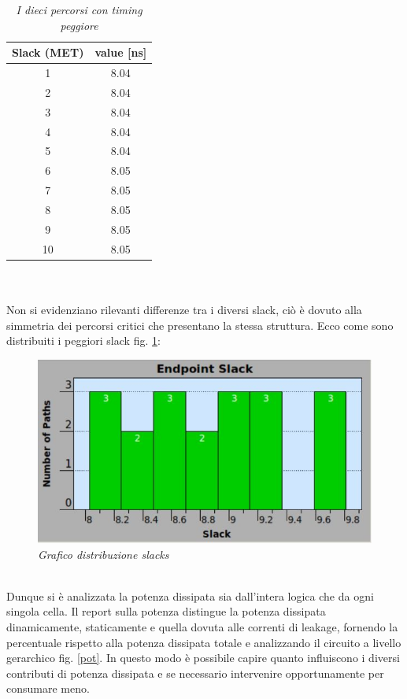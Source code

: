 \begin{table}[!h]\footnotesize
	\centering
	\begin{tabular}{|c|c|}
		\hline
		\textbf{Slack (MET)} & \textbf{value [ns]}\\
		\hline
		1 & 8.04\\
		\hline
		2 & 8.04\\
		\hline
		3 & 8.04\\
		\hline
		4 & 8.04\\
		\hline
		5 & 8.04\\
		\hline
		6 & 8.05\\
		\hline
		7 & 8.05\\
		\hline
		8 & 8.05\\
		\hline
		9 & 8.05\\
		\hline
		10 & 8.05\\
		\hline
	\end{tabular}
	\caption{\textit{I dieci percorsi con timing peggiore}}
\label{slack1}
\end{table} \\
\\
Non si evidenziano rilevanti differenze tra i diversi slack, ciò è dovuto alla simmetria dei percorsi critici che presentano la stessa struttura. 
Ecco come sono distribuiti i peggiori slack fig. \ref{slackgrafico}:
\begin{figure}[!htb]
	\centering
	\includegraphics[scale=0.6]{immagini/slacks}
	\caption{\textit{Grafico distribuzione slacks}}
	\label{slackgrafico}
\end{figure} \\
Dunque si è analizzata la potenza dissipata sia dall’intera logica che da ogni singola cella.
Il report sulla potenza distingue la potenza dissipata dinamicamente, staticamente e quella dovuta alle correnti di leakage, fornendo la percentuale rispetto alla potenza dissipata totale e analizzando il circuito a livello gerarchico fig. \ref{pot}. In questo modo è possibile capire quanto influiscono i diversi contributi di potenza dissipata e se necessario intervenire opportunamente per consumare meno. 

